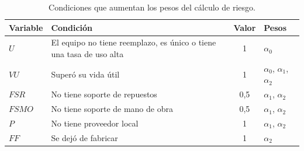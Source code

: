 \documentclass[10pt]{article}
\begin{document}
\begin{table}[H]
    \caption{Condiciones que aumentan los pesos del cálculo de riesgo.}
    \label{tab:riesgo-pesos}
    \centering
    \small
    \renewcommand{\arraystretch}{1.3}
    \begin{tabularx}{\textwidth}{l >{\raggedright\arraybackslash}X c l}
        \toprule
        \textbf{Variable} & \textbf{Condición} & \textbf{Valor} & \textbf{Pesos} \\
        \midrule
        $U$ & El equipo no tiene reemplazo, es único o tiene una tasa de uso alta & 1 & $\alpha_0$ \\
        $VU$ & Superó su vida útil & 1 & $\alpha_0$, $\alpha_1$, $\alpha_2$ \\
        $FSR$ & No tiene soporte de repuestos & 0,5 & $\alpha_1$, $\alpha_2$ \\
        $FSMO$ & No tiene soporte de mano de obra & 0,5 & $\alpha_1$, $\alpha_2$ \\
        $P$ & No tiene proveedor local & 1 & $\alpha_1$, $\alpha_2$ \\
        $FF$ & Se dejó de fabricar & 1 & $\alpha_2$ \\
        \bottomrule
    \end{tabularx}
\end{table}

\label{LastPage}
\end{document}
